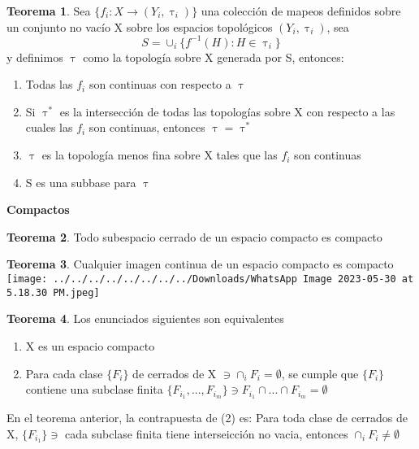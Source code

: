 \documentclass{article}
\theoremstyle{definition}
\newtheorem{theorem}{Teorema}[section]
\begin{document}
\begin{theorem}
	Sea $\{f_i:X\to(Y_i,\uptau_i)\}$ una colección de mapeos definidos sobre un conjunto no vacío X sobre los espacios topológicos $(Y_i,\uptau_i)$, sea 
	\[S=\cup_i \{f^{-1}(H):H\in\uptau_i\}\]
	y definimos $\uptau$ como la topología sobre X generada por S, entonces:
	\begin{enumerate}
	\item Todas las $f_i$ son continuas con respecto a $\uptau$
	\item Si $\uptau^*$ es la intersección de todas las topologías sobre X con respecto a las cuales las $f_i$ son continuas, entonces $\uptau=\uptau^*$
	\item $\uptau$ es la topología menos fina sobre X tales que las $f_i$ son continuas
	\item S es una subbase para $\uptau$
	\end{enumerate}
\end{theorem}


\textbf{Compactos}

\begin{theorem}
	Todo subespacio cerrado de un espacio compacto es compacto
\end{theorem}


\begin{theorem}
	Cualquier imagen continua de un espacio compacto es compacto\\
	\texttt{[image: ../../../../../../../../Downloads/WhatsApp Image 2023-05-30 at 5.18.30 PM.jpeg]} 
\end{theorem}


\begin{theorem}
	Los enunciados siguientes son equivalentes
	\begin{enumerate}
	\item X es un espacio compacto
	\item Para cada clase $\{F_i\}$ de cerrados de X $\ni\cap_iF_i=\emptyset$, se cumple que $\{F_i\}$ contiene una subclase finita $\{F_{i_1},...,F_{i_m}\}\ni F_{i_1}\cap ...\cap F_{i_m}=\emptyset$
\end{enumerate}
En el teorema anterior, la contrapuesta de (2) es: Para toda clase de cerrados de X, $\{F_{i_1}\}\ni$ cada subclase finita tiene interseicción no vacia, entonces $\cap_iF_i\neq\emptyset$ 
\end{theorem}

\end{document}
